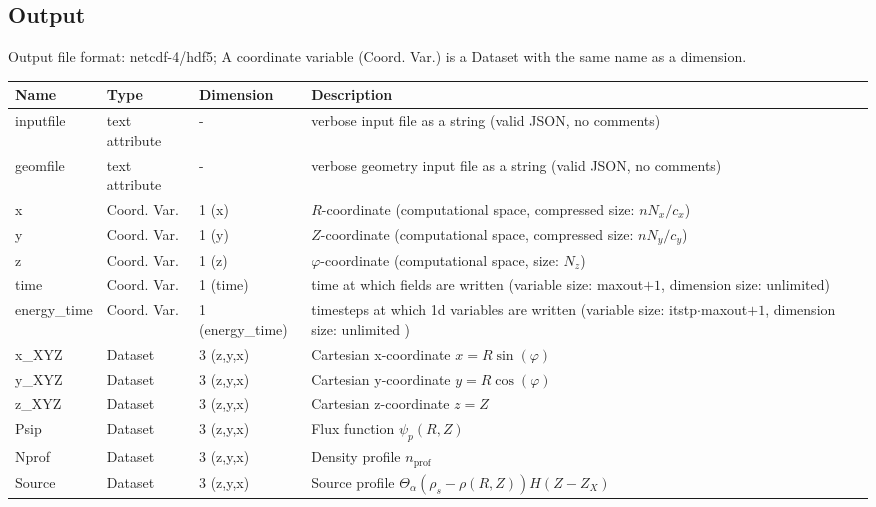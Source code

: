 \subsection{Output} \label{sec:output_file}
Output file format: netcdf-4/hdf5; A coordinate variable (Coord. Var.) is a Dataset with the same name as a dimension.
%
\begin{longtable}{lll>{\RaggedRight}p{7cm}}
\toprule
\rowcolor{gray!50}\textbf{Name} &  \textbf{Type} & \textbf{Dimension} & \textbf{Description}  \\ \midrule
inputfile  &     text attribute & - & verbose input file as a string (valid JSON, no comments) \\
geomfile   &     text attribute & - & verbose geometry input file as a string (valid JSON, no comments) \\
x                & Coord. Var. & 1 (x) & $R$-coordinate (computational space, compressed size: $nN_x/c_x$)\\
y                & Coord. Var. & 1 (y) & $Z$-coordinate (computational space, compressed size: $nN_y/c_y$)\\
z                & Coord. Var. & 1 (z) & $\varphi$-coordinate (computational space, size: $N_z$) \\
time             & Coord. Var. & 1 (time)& time at which fields are written (variable size: maxout$+1$, dimension size: unlimited) \\
energy\_time     & Coord. Var. & 1 (energy\_time) & timesteps at which 1d variables are written (variable size: itstp$\cdot$maxout$+1$, dimension size: unlimited ) \\
x\_XYZ           & Dataset & 3 (z,y,x) & Cartesian x-coordinate $x=R\sin(\varphi)$ \\
y\_XYZ           & Dataset & 3 (z,y,x) & Cartesian y-coordinate $y=R\cos(\varphi)$\\
z\_XYZ           & Dataset & 3 (z,y,x) & Cartesian z-coordinate $z=Z$ \\
Psip             & Dataset & 3 (z,y,x) & Flux function $\psi_p(R,Z)$ \\
Nprof            & Dataset & 3 (z,y,x) & Density profile $n_\text{prof}$ \\
Source           & Dataset & 3 (z,y,x) & Source  profile $\Theta_\alpha(\rho_{s} - \rho(R,Z)) H(Z-Z_X)$\\

\end{longtable}
